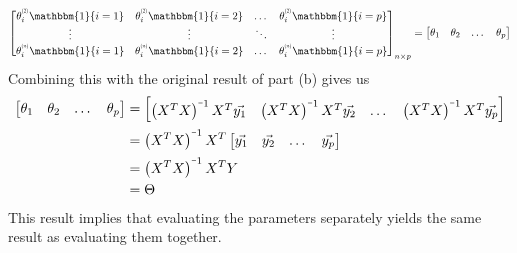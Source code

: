 \documentclass{article}
\newcommand{\minus}{\scalebox{0.5}[1.0]{$-$}}
\newcommand{\supi}[1]{\scalebox{0.6}[0.75]{$^{(#1)}$}}
\begin{document}
\begin{enumerate}[label=(\alph*)]
\begin{align*}
\begin{bmatrix}
            \theta_i^{\supi{2}}\mathbbm{1}\{i=1\} & \theta_i^{\supi{2}}\mathbbm{1}\{i=2\} & \dots & \theta_i^{\supi{2}}\mathbbm{1}\{i=p\} \\
            \vdots &\vdots &\ddots &\vdots\\
            \theta_i^{\supi{n}}\mathbbm{1}\{i=1\} &\theta_i^{\supi{n}}\mathbbm{1}\{i=2\} &\dots &\theta_i^{\supi{n}}\mathbbm{1}\{i=p\}
        \end{bmatrix}_{n\times p}
         = 
        \begin{bmatrix}
            \theta_1 &\theta_2 &\dots &\theta_p
        \end{bmatrix}
    \end{align*}
    Combining this with the original result of part (b) gives us
    \begin{align*}
        \begin{bmatrix}
            \theta_1 &\theta_2 &\dots &\theta_p
        \end{bmatrix}
        &{}= \begin{bmatrix}
            \left(X^TX\right)^{\minus1} X^T\Vec{y_1} &\left(X^TX\right)^{\minus1} X^T\Vec{y_2} &\dots &\left(X^TX\right)^{\minus1} X^T\Vec{y_p}
        \end{bmatrix}\\
        &{}= \left(X^TX\right)^{\minus1} X^T
        \begin{bmatrix}
            \Vec{y_1} &\Vec{y_2} &\dots &\Vec{y_p}
        \end{bmatrix}\\
        &{}= \left(X^TX\right)^{\minus1} X^TY\\
        &{}= \Theta
    \end{align*}
    This result implies that evaluating the parameters separately yields the same result as evaluating them together.
\end{enumerate}

\end{document}
